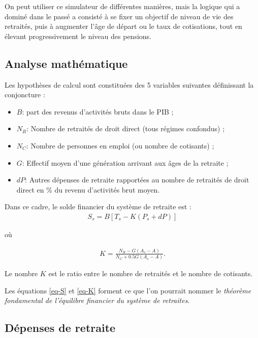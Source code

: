 \documentclass[10pt]{article}
\begin{document}
On peut utiliser ce simulateur de différentes manières, mais la 
logique qui a dominé dans le passé a consisté à se fixer un objectif 
de niveau de vie des retraités, puis à augmenter l'âge de départ ou 
le taux de cotisations, tout en élevant progressivement le niveau des pensions. 


\subsection{Analyse mathématique}

Les hypothèses de calcul sont constituées des 5 variables suivantes définissant la conjoncture :
\begin{itemize}
\item $B$: part des revenus d'activités bruts dans le PIB ;
\item $N_R$: Nombre de retraités de droit direct (tous régimes confondus) ;
\item $N_C$: Nombre de personnes en emploi (ou nombre de cotisants) ;
\item $G$: Effectif moyen d'une génération arrivant aux âges de la retraite ;
\item $dP$: Autres dépenses de retraite rapportées au nombre de retraités 
de droit direct en \% du revenu d'activités brut moyen.
\end{itemize}

Dans ce cadre, le solde financier du système de retraite est :
\begin{eqnarray}
S_s =  B [T_s - K (P_s + dP)] \label{eq-S}
\end{eqnarray}

où

\begin{eqnarray}
K = \frac{N_R - G(A_s - A)}{N_C + 0.5 G(A_s - A)}. \label{eq-K}
\end{eqnarray}

Le nombre $K$ est le ratio entre le nombre de retraités et le nombre de cotisants. 

Les équations \ref{eq-S} et \ref{eq-K} forment ce que l'on pourrait 
nommer le \emph{théorème fondamental de l'équilibre financier du système de retraites}. 


\subsection{Dépenses de retraite}
\end{document}
